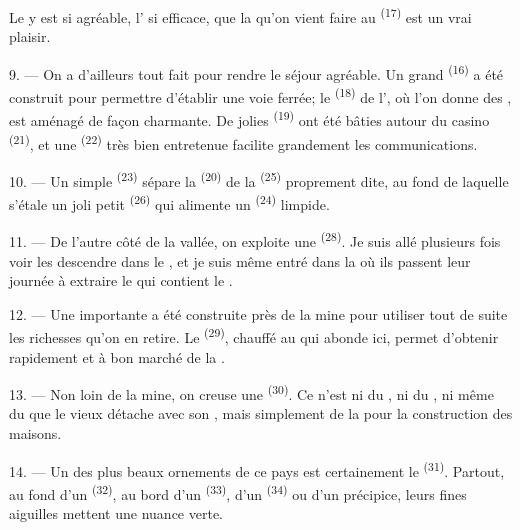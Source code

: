 Le  y est si agréable, l' si efficace, que
la  qu'on vient faire au  \textsuperscript{(17)}
est un vrai plaisir.

\VUsaut{3.0mm}
\VUsaut{3.0mm}

9. --- On a d'ailleurs tout fait pour rendre le séjour agréable. Un grand
 \textsuperscript{(16)} a été construit pour permettre d'établir
une voie ferrée; le  \textsuperscript{(18)} de
l', où l'on donne des , est
aménagé de façon charmante. De jolies  \textsuperscript{(19)} ont
été bâties autour du casino \textsuperscript{(21)}, et une 
\textsuperscript{(22)} très bien entretenue facilite grandement les
communications.

10. --- Un simple  \textsuperscript{(23)} sépare la
 \textsuperscript{(20)} de la 
\textsuperscript{(25)} proprement dite, au fond de laquelle s'étale un joli
petit  \textsuperscript{(26)} qui alimente un 
\textsuperscript{(24)} limpide.

11. --- De l'autre côté de la vallée, on exploite une 
\textsuperscript{(28)}. Je suis allé plusieurs fois voir les 
descendre dans le , et je suis même entré dans la
 où ils passent leur journée à extraire le  qui
contient le .

12. --- Une importante  a été construite près de la mine pour
utiliser tout de suite les richesses qu'on en retire. Le 
\textsuperscript{(29)}, chauffé au  qui abonde ici,
permet d'obtenir rapidement et à bon marché de la .

13. --- Non loin de la mine, on creuse une 
\textsuperscript{(30)}. Ce n'est ni du , ni du ,
ni même du  que le vieux  détache avec son
, mais simplement de la  pour la
construction des maisons.

14. --- Un des plus beaux ornements de ce pays est certainement le
 \textsuperscript{(31)}. Partout, au fond d'un 
\textsuperscript{(32)}, au bord d'un  \textsuperscript{(33)},
d'un  \textsuperscript{(34)} ou d'un précipice, leurs fines
aiguilles mettent une nuance verte.

